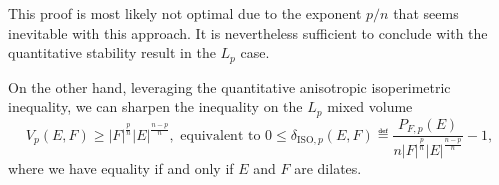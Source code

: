 \documentclass[a4paper, 10pt, twoside]{amsart}
\numberwithin{equation}{section}
\theoremstyle{plain}
\theoremstyle{definition}
\begin{document}
This proof is most likely not optimal due to the exponent $p/n$ that seems inevitable with this approach. It is nevertheless sufficient to conclude with the quantitative stability result in the $L_p$ case.

On the other hand, leveraging the quantitative anisotropic isoperimetric inequality, we can sharpen the inequality on the $L_p$ mixed volume
\begin{equation}\label{eq.Lp_Minkowski_inequality}
    V_p(E,F) \ge 
    |F|^{\frac{p}{n}}{|E|}^{\frac{n-p}{n}},
    \text{ equivalent to }
    0\le 
    \delta_{\text{ISO},p}(E,F) 
    \eqdef 
    \frac{P_{F,p}(E)}{
        n|F|^{\frac{p}{n}}{|E|}^{\frac{n-p}{n}}
    } - 1,
\end{equation}
where we have equality if and only if $E$ and $F$ are dilates.  


\end{document}
